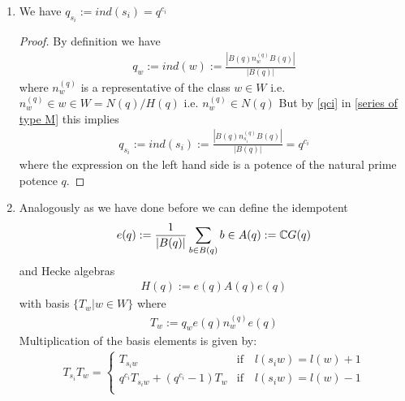 \documentclass[]{article}
\begin{document}
\begin{remark}
\begin{enumerate}
\begin{proof}
        it is also injective. 
        \end{proof}
        \item We have \(q_{s_i} := ind(s_i) = q^{c_i} \)
        \begin{proof}
            By definition we have
            \begin{align*}
                q_w := ind(w):= \frac{|B(q) n^{(q)}_w B(q)|}{|B(q)|}
            \end{align*}
            where \(n^{(q)}_w\) is a representative of the class \(w \in W\) i.e. \(n^{(q)}_w \in w \in W=N(q)/H(q)\) i.e. \(n^{(q)}_w \in N(q)\)
            But by \ref{qci} in \ref{series of type M} this implies 
            \begin{align*}
                q_{s_i} := ind(s_i):= \frac{|B(q) n^{(q)}_{s_i} B(q)|}{|B(q)|} = q^{c_i}
            \end{align*}
            where the expression on the left hand side is a potence of the natural prime potence \(q\).
        \end{proof}
        \item Analogously as we have done before we can define the idempotent
        \begin{align*}
            e(q):= \frac{1}{|B(q)|} \sum_{b \in B(q)}^{} b \in A(q):={\mathbb{C}} G(q)
        \end{align*}
        and Hecke algebras
        \begin{align*}
            H(q):= e(q) A(q) e(q)
        \end{align*}
        with basis \(\{T_w | w \in W\}\) where 
        \begin{align*}
            T_w := q_w e(q) n_w^{(q)} e(q)
        \end{align*}
        Multiplication of the basis elements is given by:
        \begin{align*}
            T_{s_i} T_w =
            \begin{cases}
                T_{s_i w}& \text{if} \quad l(s_i w) = l(w) +1 \\
                q^{c_i}T_{s_i w}+(q^{c_i}-1)T_w & \text{if} \quad l(s_i w)= l(w)-1 \\
            \end{cases}
        \end{align*}
    \end{enumerate}
\end{remark}
\end{document}
